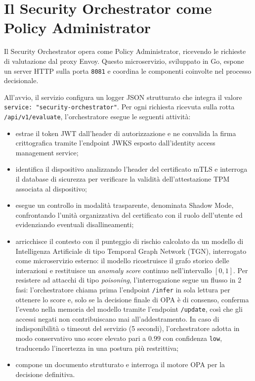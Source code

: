 \section{Il Security Orchestrator come Policy Administrator}

Il Security Orchestrator opera come Policy Administrator, ricevendo le richieste di valutazione dal proxy Envoy. Questo microservizio, sviluppato in Go, espone un server HTTP sulla porta \texttt{8081} e coordina le componenti coinvolte nel processo decisionale.

All'avvio, il servizio configura un logger JSON strutturato che integra il valore \texttt{service: "security-orchestrator"}. Per ogni richiesta ricevuta sulla rotta \texttt{/api/v1/evaluate}, l'orchestratore esegue le seguenti attività:

\begin{itemize}
\item estrae il token JWT dall'header di autorizzazione e ne convalida la firma crittografica tramite l'endpoint JWKS esposto dall'identity access management service;

\item identifica il dispositivo analizzando l'header del certificato mTLS e interroga il database di sicurezza per verificare la validità dell'attestazione TPM associata al dispositivo;

\item esegue un controllo in modalità trasparente, denominata Shadow Mode, confrontando l'unità organizzativa del certificato con il ruolo dell'utente ed evidenziando eventuali disallineamenti;

 \item arricchisce il contesto con il punteggio di rischio calcolato da un modello di
  Intelligenza Artificiale di tipo Temporal Graph Network (TGN), interrogato come microservizio
  esterno: il modello ricostruisce il grafo storico delle interazioni e restituisce un
  \textit{anomaly score} continuo nell'intervallo $[0,1]$. Per resistere ad attacchi di tipo
  \textit{poisoning}, l'interrogazione segue un flusso in 2 fasi: l'orchestratore chiama prima
  l'endpoint \texttt{/infer} in sola lettura per ottenere lo score e, solo se la decisione
  finale di OPA è di consenso, conferma l'evento nella memoria del modello tramite l'endpoint
  \texttt{/update}, così che gli accessi negati non contribuiscano mai all'addestramento. In
  caso di indisponibilità o timeout del servizio (5 secondi), l'orchestratore adotta in
  modo conservativo uno score elevato pari a $0.99$ con confidenza \texttt{low}, traducendo
  l'incertezza in una postura più restrittiva;

\item compone un documento strutturato e interroga il motore OPA per la decisione definitiva.
\end{itemize}

